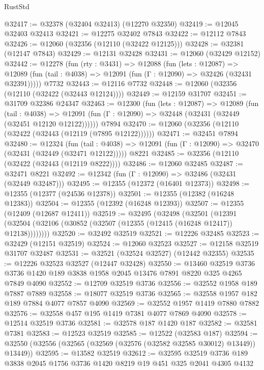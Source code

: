 \begin{lexlean}{RustStd}
\begin{coremodule}
@32417 := @32378 (@32404 @32413) (@12270 @32350)
@32419 := @12045 @32403 @32413
@32421 := @12275 @32402 @7843
@32422 := @12112 @7843
@32426 := @12060 (@32356 (@12110 (@32422 @12125)))
@32428 := @32381 (@12147 @7843)
@32429 := @12131 @32428
@32431 := @12060 (@32429 @12152)
@32442 := @12278
    (fun (rty : @3431) =>
    @12088
      (fun (lets : @12087) =>
      @12089 (fun (tail : @4038) => @12091 (fun (Γ : @12090) => @32426 (@32431 @32391)))))
    @7732
@32443 := @12116 @7732
@32448 := @12060 (@32356 (@12110 (@32422 (@32443 @12124))))
@32449 := @12159 @31707
@32451 := @31709 @32386 @24347
@32463 := @12300
    (fun (lets : @12087) =>
    @12089
      (fun (tail : @4038) =>
      @12091 (fun (Γ : @12090) => @32448 (@32431 (@32449 (@32451 @12120 @12122))))))
    @7894
@32470 := @12060 (@32356 (@12110 (@32422 (@32443 (@12119 (@7895 @12122))))))
@32471 := @32451 @7894
@32480 := @12324
    (fun (tail : @4038) => @12091 (fun (Γ : @12090) => @32470 (@32431 (@32449 (@32471 @12122)))))
    @8221
@32485 := @32356 (@12110 (@32422 (@32443 (@12119 @8222))))
@32486 := @12060 @32485
@32487 := @32471 @8221
@32492 := @12342 (fun (Γ : @12090) => @32486 (@32431 (@32449 @32487)))
@32495 := @12355 (@12372 (@16401 @12373))
@32498 := @12355 (@12377 (@24536 @12378))
@32501 := @12355 (@12382 (@16248 @12383))
@32504 := @12355 (@12392 (@16248 @12393))
@32507 := @12355 (@12409 (@12687 @12411))
@32519 := @32495
    (@32498
      (@32501
        (@12391 (@32504 (@32106 (@30852 (@32507 (@12355 (@12415 (@16248 @12417)) @12138))))))))
@32520 := @32492 @32519
@32521 := @12226 @32485
@32523 := @32429 (@12151 @32519)
@32524 := @12060 @32523
@32527 := @12158 @32519 @31707 @32487
@32531 := @32521 (@32524 @32527) (@12442 @32355)
@32535 := @12226 @32523 @32527 (@12447 @32428)
@32550 := @13460
    @32519
    @3736
    @3736
    @1420
    @189
    @3838
    @1958
    @2045
    @13476
    @7891
    @8220
    @325
    @4265
    @7849
    @4090
@32552 := @12709 @32519 @3736
@32556 := @32552 @1958 @189 @7887 @7889
@32558 := @18077 @32519 @3736
@32565 := @32558 @1957 @182 @189 @7884 @4077 @7857 @4090
@32569 := @32552 @1957 @1419 @7880 @7882
@32576 := @32558 @457 @195 @1419 @7381 @4077 @7869 @4090
@32578 := @12514 @32519 @3736
@32581 := @32578 @187 @1420 @187
@32582 := @32581 @7381
@32583 := @12523 @32519
@32585 := @12522 (@32583 @187)
@32594 := @32550 (@32556 (@32565 (@32569 (@32576 (@32582 @32585 @30012) @13449)) @13449))
@32595 := @13582 @32519
@32612 := @32595
    @32519
    @3736
    @189
    @3838
    @2045
    @1756
    @3736
    @1420
    @8219
    @19
    @451
    @325
    @2041
    @4305
    @4132

\end{coremodule}
\end{lexlean}
